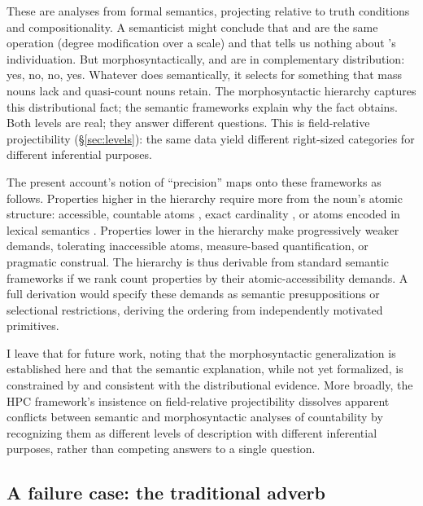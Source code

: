 \documentclass[12pt,a4paper]{article}
\begin{document}
These are analyses from formal semantics, projecting relative to truth conditions and compositionality. A semanticist might conclude that  and  are the same operation (degree modification over a scale) and that  tells us nothing about 's individuation. But morphosyntactically,  and  are in complementary distribution:  yes,  no,  no,  yes. Whatever  does semantically, it selects for something that mass nouns lack and quasi-count nouns retain. The morphosyntactic hierarchy captures this distributional fact; the semantic frameworks explain why the fact obtains. Both levels are real; they answer different questions. This is field-relative projectibility (\S\ref{sec:levels}): the same data yield different right-sized categories for different inferential purposes.

The present account's notion of \enquote{precision} maps onto these frameworks as follows. Properties higher in the hierarchy require more from the noun's atomic structure: accessible, countable atoms \citep{grimm2018}, exact cardinality \citep{rothstein2010}, or atoms encoded in lexical semantics \citep{chierchia1998}. Properties lower in the hierarchy make progressively weaker demands, tolerating inaccessible atoms, measure-based quantification, or pragmatic construal. The hierarchy is thus derivable from standard semantic frameworks if we rank count properties by their atomic-accessibility demands. A full derivation would specify these demands as semantic presuppositions or selectional restrictions, deriving the ordering from independently motivated primitives.

I leave that for future work, noting that the morphosyntactic generalization is established here and that the semantic explanation, while not yet formalized, is constrained by and consistent with the distributional evidence. More broadly, the HPC framework's insistence on field-relative projectibility dissolves apparent conflicts between semantic and morphosyntactic analyses of countability by recognizing them as different levels of description with different inferential purposes, rather than competing answers to a single question.

\subsection{A failure case: the traditional adverb}
\end{document}
